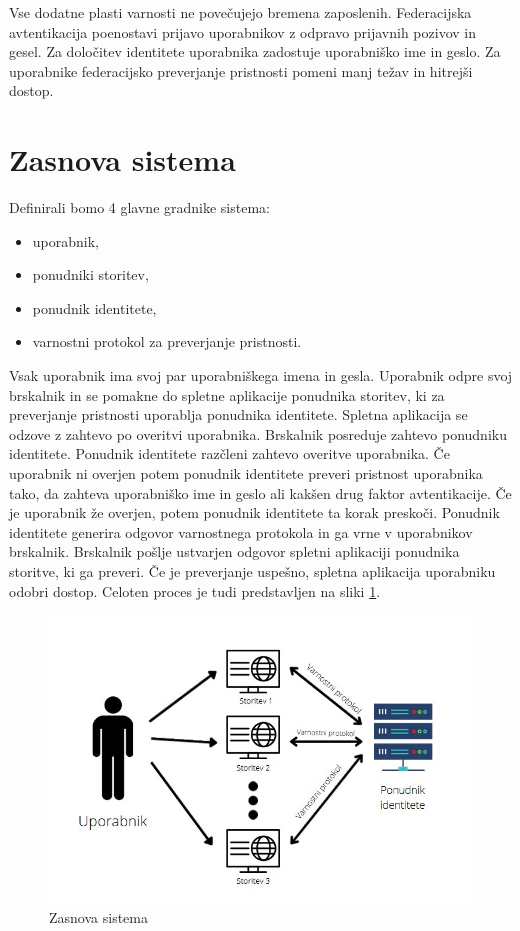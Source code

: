 \documentclass[a4paper,12pt,openright]{book}
\begin{document}
Vse dodatne plasti varnosti ne povečujejo bremena zaposlenih. Federacijska avtentikacija poenostavi prijavo uporabnikov z odpravo prijavnih pozivov in gesel. Za določitev identitete uporabnika zadostuje uporabniško ime in geslo. Za uporabnike federacijsko preverjanje pristnosti pomeni manj težav in hitrejši dostop.
\section{Zasnova sistema}
Definirali bomo 4 glavne gradnike sistema:
\begin{itemize}
    \item uporabnik,
    \item ponudniki storitev,
    \item ponudnik identitete,
    \item varnostni protokol za preverjanje pristnosti.
\end{itemize}

Vsak uporabnik ima svoj par uporabniškega imena in gesla. Uporabnik odpre svoj brskalnik in se pomakne do spletne aplikacije ponudnika storitev, ki za preverjanje pristnosti uporablja ponudnika identitete. Spletna aplikacija se odzove z zahtevo po overitvi uporabnika. Brskalnik posreduje zahtevo ponudniku identitete. Ponudnik identitete razčleni zahtevo overitve uporabnika. Če uporabnik ni overjen potem ponudnik identitete preveri pristnost uporabnika tako, da zahteva uporabniško ime in geslo ali kakšen drug faktor avtentikacije. Če je uporabnik že overjen, potem ponudnik identitete ta korak preskoči. Ponudnik identitete generira odgovor varnostnega protokola in ga vrne v uporabnikov brskalnik. Brskalnik pošlje ustvarjen odgovor spletni aplikaciji ponudnika storitve, ki ga preveri. Če je preverjanje uspešno, spletna aplikacija uporabniku odobri dostop. Celoten proces je tudi predstavljen na sliki \ref{fig:zasnova sistema}.

\begin{figure}[H]
\hspace{-1cm}
\includegraphics[scale=0.85]{diploma-FRI-vzorec_11maj2021/Prof_sistem.jpg}
\caption{Zasnova sistema}
\label{fig:zasnova sistema}
\end{figure}
\end{document}
